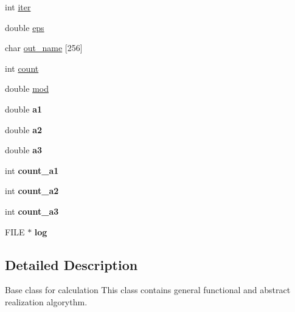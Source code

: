 \begin{DoxyCompactItemize}
\item 
int \hyperlink{classAlg_a68d89159e07d755c5ec4235a10928674}{iter}
\item 
double \hyperlink{classAlg_aacfa2077c54f2971b335927ef4e952c8}{eps}
\item 
char \hyperlink{classAlg_a57e8fa04c6ffb36bb472077251682493}{out\_\-name} \mbox{[}256\mbox{]}
\item 
int \hyperlink{classAlg_a919db7af2565185ba66adc8c0ae54686}{count}
\item 
double \hyperlink{classAlg_a48f35bad3ab97c5bbabb1ecf572980e1}{mod}
\item 
\hypertarget{classAlg_a5456c37cc79b3b4599421034770bfe47}{
double {\bfseries a1}}
\label{classAlg_a5456c37cc79b3b4599421034770bfe47}

\item 
\hypertarget{classAlg_a4e01d2438ed834ec2e907a76225ef6c9}{
double {\bfseries a2}}
\label{classAlg_a4e01d2438ed834ec2e907a76225ef6c9}

\item 
\hypertarget{classAlg_aa7c6cd580b013334b155470c16487b85}{
double {\bfseries a3}}
\label{classAlg_aa7c6cd580b013334b155470c16487b85}

\item 
\hypertarget{classAlg_a18ce9365df4d088e54a47175f8abc298}{
int {\bfseries count\_\-a1}}
\label{classAlg_a18ce9365df4d088e54a47175f8abc298}

\item 
\hypertarget{classAlg_ac53103a2592938146864e8d0417ca334}{
int {\bfseries count\_\-a2}}
\label{classAlg_ac53103a2592938146864e8d0417ca334}

\item 
\hypertarget{classAlg_a382a13f475dc2ef8b44637d26cf5af2a}{
int {\bfseries count\_\-a3}}
\label{classAlg_a382a13f475dc2ef8b44637d26cf5af2a}

\item 
\hypertarget{classAlg_adc69cc8818bcc5c1edca9c2d987385d4}{
FILE $\ast$ {\bfseries log}}
\label{classAlg_adc69cc8818bcc5c1edca9c2d987385d4}

\end{DoxyCompactItemize}


\subsection{Detailed Description}
Base class for calculation  This class contains general functional and abstract realization algorythm. 

